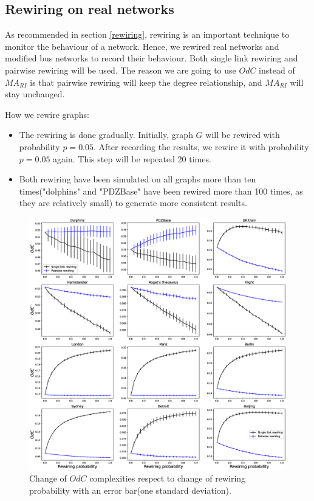 \documentclass[12pt]{article}
\begin{document}
\subsection{Rewiring on real networks}
As recommended in section \ref{rewiring}, rewiring is an important technique to monitor the behaviour of a network. Hence, we rewired real networks and modified bus networks to record their behaviour. Both single link rewiring and pairwise rewiring will be used. The reason we are going to use $OdC$ instead of $MA_{RI}$ is that pairwise rewiring will keep the degree relationship, and $MA_{RI}$ will stay unchanged.\par
How we rewire graphs:
\begin{itemize}
    \item The rewiring is done gradually. Initially, graph $G$ will be rewired with probability $p=0.05$. After recording the results, we rewire it with probability $p=0.05$ again. This step will be repeated 20 times.
    \item Both rewiring have been simulated on all graphs more than ten times("dolphins" and "PDZBase" have been rewired more than 100 times, as they are relatively small) to generate more consistent results.
\end{itemize}
\begin{figure}[!pht]
    \centering
    \includegraphics[width=\textwidth]{rewiring.eps}
    \caption{Change of $OdC$ complexities respect to change of rewiring probability with an error bar(one standard deviation).}
    \label{fig:rewiring}
\end{figure}
\end{document}
